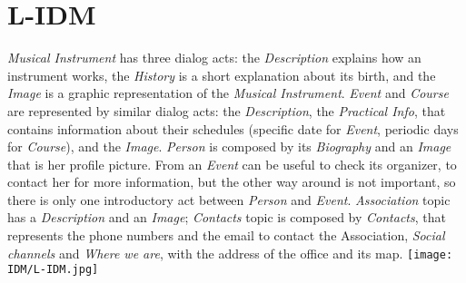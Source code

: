 \documentclass[../../DD.tex]{subfiles}
\begin{document}
\section{L-IDM}
	\textit{Musical Instrument} has three dialog acts: the \textit{Description} explains how an instrument works, the \textit{History} is a short explanation about its birth, and the \textit{Image} is a graphic representation of the \textit{Musical Instrument}.
	\textit{Event} and \textit{Course} are represented by similar dialog acts: the \textit{Description}, the \textit{Practical Info}, that contains information about their schedules (specific date for \textit{Event}, periodic days for \textit{Course}), and the \textit{Image}.
	\newline
	\textit{Person} is composed by its \textit{Biography} and an \textit{Image} that is her profile picture. From an \textit{Event} can be useful to check its organizer, to contact her for more information, but the other way around is not important, so there is only one introductory act between \textit{Person} and \textit{Event}.
	\newline
	\textit{Association} topic has a \textit{Description} and an \textit{Image}; \textit{Contacts} topic is composed by \textit{Contacts}, that represents the phone numbers and the email to contact the Association, \textit{Social channels} and \textit{Where we are}, with the address of the office and its map.
	\newline
	\texttt{[image: IDM/L-IDM.jpg]}
\end{document}
